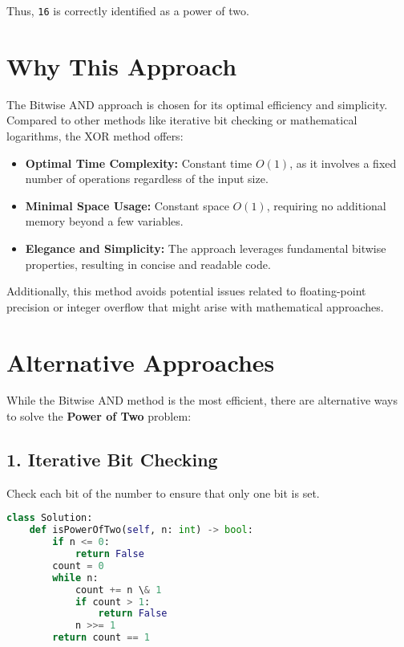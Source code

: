 Thus, \texttt{16} is correctly identified as a power of two.

\section*{Why This Approach}

The Bitwise AND approach is chosen for its optimal efficiency and simplicity. Compared to other methods like iterative bit checking or mathematical logarithms, the XOR method offers:

\begin{itemize}
    \item \textbf{Optimal Time Complexity:} Constant time \(O(1)\), as it involves a fixed number of operations regardless of the input size.
    \item \textbf{Minimal Space Usage:} Constant space \(O(1)\), requiring no additional memory beyond a few variables.
    \item \textbf{Elegance and Simplicity:} The approach leverages fundamental bitwise properties, resulting in concise and readable code.
\end{itemize}

Additionally, this method avoids potential issues related to floating-point precision or integer overflow that might arise with mathematical approaches.

\section*{Alternative Approaches}

While the Bitwise AND method is the most efficient, there are alternative ways to solve the \textbf{Power of Two} problem:

\subsection*{1. Iterative Bit Checking}

Check each bit of the number to ensure that only one bit is set.

\begin{lstlisting}[language=Python]
class Solution:
    def isPowerOfTwo(self, n: int) -> bool:
        if n <= 0:
            return False
        count = 0
        while n:
            count += n \& 1
            if count > 1:
                return False
            n >>= 1
        return count == 1
\end{lstlisting}

